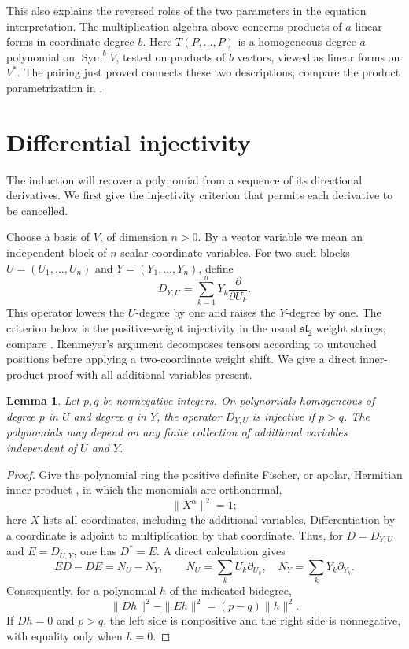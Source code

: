 \documentclass[11pt]{article}
\newtheorem{lemma}[theorem]{Lemma}
\theoremstyle{remark}
\DeclareMathOperator{\Sym}{Sym}
\newcommand{\D}[2]{D_{#1,#2}}
\begin{document}
This also explains the reversed roles of the two parameters in the equation
interpretation. The multiplication algebra above concerns products of $a$
linear forms in coordinate degree $b$. Here $T(P,\ldots,P)$ is a homogeneous
degree-$a$ polynomial on $\Sym^b V$, tested on products of $b$ vectors, viewed as linear
forms on $V^*$. The pairing just proved connects these two descriptions;
compare the product parametrization in \cite[Section~2]{RSW}.

\section{Differential injectivity}\label{sec:differential}

The induction will recover a polynomial from a sequence of its
directional derivatives. We first give the injectivity criterion that
permits each derivative to be cancelled.

Choose a basis of $V$, of dimension $n>0$. By a vector variable we mean an
independent block of $n$ scalar coordinate variables. For two such blocks
$U=(U_1,\ldots,U_n)$ and $Y=(Y_1,\ldots,Y_n)$, define
\[
 \D{Y}{U}=\sum_{k=1}^n Y_k\frac{\partial}{\partial U_k}.
\]
This operator lowers the $U$-degree by one and raises the $Y$-degree by one.
The criterion below is the positive-weight injectivity in the usual
$\mathfrak{sl}_2$ weight strings; compare
\cite[Section~11.1, Claim~11.4 and equation~(11.5)]{FultonHarris}.
Ikenmeyer's argument \cite[Section~5, Claim~5.1]{Ikenmeyer} decomposes
tensors according to untouched positions before applying a two-coordinate
weight shift.
We give a direct inner-product proof with all additional variables present.

\begin{lemma}\label{lem:shift}
Let $p,q$ be nonnegative integers. On polynomials homogeneous of degree $p$
in $U$ and degree $q$ in $Y$, the operator $\D{Y}{U}$ is injective if
$p>q$. The polynomials may depend on any finite collection of additional
variables independent of $U$ and $Y$.
\end{lemma}

\begin{proof}
Give the polynomial ring the positive definite Fischer, or apolar,
Hermitian inner product
\cite[Section~2, equation~(8) and Proposition~3]{AldazRender}, in which
the monomials are orthonormal,
\[
 \|X^\alpha\|^2=1;
\]
here $X$ lists all coordinates, including the additional variables.
Differentiation by a coordinate is adjoint to multiplication by that
coordinate. Thus, for $D=\D{Y}{U}$ and $E=\D{U}{Y}$, one has $D^*=E$.
A direct calculation gives
\[
 ED-DE=N_U-N_Y,
 \qquad
 N_U=\sum_k U_k\partial_{U_k},\quad
 N_Y=\sum_k Y_k\partial_{Y_k}.
\]
Consequently, for a polynomial $h$ of the indicated bidegree,
\begin{equation}\label{eq:norm}
 \|Dh\|^2-\|Eh\|^2=(p-q)\|h\|^2.
\end{equation}
If $Dh=0$ and $p>q$, the left side is nonpositive and the right side is
nonnegative, with equality only when $h=0$.
\end{proof}
\end{document}
